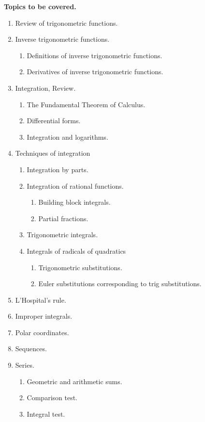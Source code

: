 \documentclass{article}
\begin{document}
\medskip
\noindent \textbf{Topics to be covered.} 
\renewcommand{\theenumii}{\arabic{enumii}}
\begin{enumerate}
\item Review of trigonometric functions.
\item Inverse trigonometric functions.
\begin{enumerate}
\item Definitions of inverse trigonometric functions.
\item Derivatives of inverse trigonometric functions.
\end{enumerate}
\item Integration, Review.
\begin{enumerate}
\item The Fundamental Theorem of Calculus.
\item Differential forms.
\item Integration and logarithms.
\end{enumerate}
\item Techniques of integration
\begin{enumerate}
\item Integration by parts.
\item Integration of rational functions.
\begin{enumerate}
\item Building block integrals.
\item Partial fractions.
\end{enumerate}
\item Trigonometric integrals.
\item Integrals of radicals of quadratics
\begin{enumerate}
\item Trigonometric substitutions.
\item Euler substitutions corresponding to trig substitutions.
\end{enumerate}
\end{enumerate}
\item L'Hospital's rule.
\item Improper integrals.
\item Polar coordinates.
\item Sequences.
\item Series.
\begin{enumerate}
\item Geometric and arithmetic sums.
\item Comparison test.
\item Integral test.

\end{enumerate}
\end{enumerate}
\end{document}
